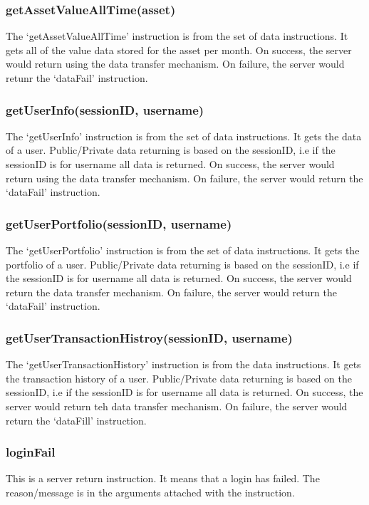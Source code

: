 \documentclass[a4paper]{article}
\begin{document}
\subsubsection{getAssetValueAllTime(asset)}
\label{protocol_inst_getassetvaluealltime}
The `getAssetValueAllTime' instruction is from the set of data instructions. It
gets all of the value data stored for the asset per month. On success, the
server would return using the data transfer mechanism. On failure, the server
would retunr the `dataFail' instruction.

\subsubsection{getUserInfo(sessionID, username)}
\label{protocol_inst_getuserinfo}
The `getUserInfo' instruction is from the set of data instructions. It gets the
data of a user. Public/Private data returning is based on the sessionID, i.e if
the sessionID is for username all data is returned. On success, the server
would return using the data transfer mechanism. On failure, the server would
return the `dataFail' instruction.

\subsubsection{getUserPortfolio(sessionID, username)}
\label{protocol_inst_getuserportfolio}
The `getUserPortfolio' instruction is from the set of data instructions. It
gets the portfolio of a user. Public/Private data returning is based on the
sessionID, i.e if the sessionID is for username all data is returned. On
success, the server would return the data transfer mechanism. On failure, the
server would return the `dataFail' instruction.

\subsubsection{getUserTransactionHistroy(sessionID, username)}
\label{protocol_inst_getusertransactionhistory}
The `getUserTransactionHistory' instruction is from the data instructions. It
gets the transaction history of a user. Public/Private data returning is based
on the sessionID, i.e if the sessionID is for username all data is returned. On
success, the server would return teh data transfer mechanism. On failure, the
server would return the `dataFill' instruction.

\subsubsection{loginFail}
\label{protocol_inst_loginfail}
This is a server return instruction. It means that a login has failed. The
reason/message is in the arguments attached with the instruction.
\end{document}
